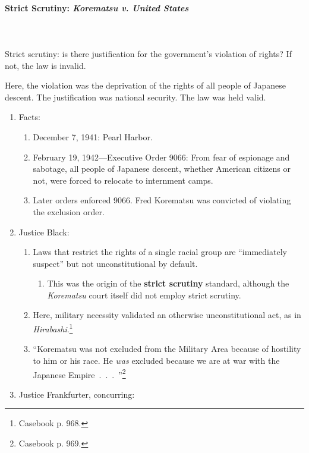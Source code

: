 \paragraph{Strict Scrutiny: \emph{Korematsu v. United States}}
~\\\\
Strict scrutiny: is there justification for the government's violation of 
rights? If not, the law is invalid.

Here, the violation was the deprivation of the rights of all people of 
Japanese descent. The justification was national security. The law was held 
valid.

\begin{enumerate}
    \item Facts:
    \begin{enumerate}
        \item December 7, 1941: Pearl Harbor.
        \item February 19, 1942---Executive Order 9066: From fear of espionage 
        and sabotage, all people of Japanese descent, whether American 
        citizens or not, were forced to relocate to internment camps.
        \item Later orders enforced 9066. Fred Korematsu was convicted of 
        violating the exclusion order.
    \end{enumerate}
    \item Justice Black:
    \begin{enumerate}
        \item Laws that restrict the rights of a single racial group are 
        ``immediately suspect'' but not unconstitutional by default.
        \begin{enumerate}
            \item This was the origin of the \textbf{strict scrutiny} 
            standard, although the \emph{Korematsu} court itself did not 
            employ strict scrutiny.
        \end{enumerate}
        \item Here, military necessity validated an otherwise 
        unconstitutional act, as in \emph{Hirabashi}.\footnote{Casebook p. 
        968.}
        \item ``Korematsu was not excluded from the Military Area because 
        of hostility to him or his race. He \emph{was} excluded because 
        we are at war with the Japanese Empire~.~.~.~''\footnote{Casebook 
        p. 969.}
    \end{enumerate}
    \item Justice Frankfurter, concurring:

\end{enumerate}
